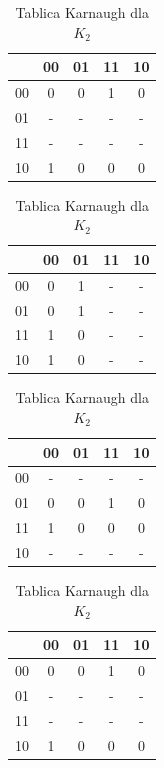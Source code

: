 \documentclass[12pt,a4paper]{article}
\begin{document}
			\begin{table}[H]
				\begin{minipage}{.5\textwidth}
					\caption{Tablica Karnaugh dla $J_2$}
					\vspace{0.2cm}
					\centering
					\begin{tabular}{c|c|c|c|c}
						\backslashbox{$AQ_2$}{$Q_1Q_0$}&00&01&11&10\\\hline
						00	&	0	&	0	&	1	&	0	\\\hline
						01	&	-	&	-	&	-	&	-	\\\hline
						11	&	-	&	-	&	-	&	-	\\\hline
						10	&	1	&	0	&	0	&	0	
					\end{tabular}
				
					\caption{Tablica Karnaugh dla $J_1$}
					\vspace{0.2cm}
					\centering
					\begin{tabular}{c|c|c|c|c}
						\backslashbox{$AQ_2$}{$Q_1Q_0$}&00&01&11&10\\\hline
						00	&	0	&	1	&	-	&	-	\\\hline
						01	&	0	&	1	&	-	&	-	\\\hline
						11	&	1	&	0	&	-	&	-	\\\hline
						10	&	1	&	0	&	-	&	-	
					\end{tabular}
				
					\caption{Tablica Karnaugh dla $J_0$}
					\vspace{0.2cm}
					\centering
					\begin{tabular}{c|c|c|c|c}
						\backslashbox{$AQ_2$}{$Q_1Q_0$}&00&01&11&10\\\hline
						00	&	-	&	-	&	-	&	-	\\\hline
						01	&	0	&	0	&	1	&	0	\\\hline
						11	&	1	&	0	&	0	&	0	\\\hline
						10	&	-	&	-	&	-	&	-	
					\end{tabular}
				\end{minipage}%
				\begin{minipage}{.5\textwidth}
					\caption{Tablica Karnaugh dla $K_2$}
					\vspace{0.2cm}
					\centering
					\begin{tabular}{c|c|c|c|c}
						\backslashbox{$AQ_2$}{$Q_1Q_0$}&00&01&11&10\\\hline
						00	&	0	&	0	&	1	&	0	\\\hline
						01	&	-	&	-	&	-	&	-	\\\hline
						11	&	-	&	-	&	-	&	-	\\\hline
						10	&	1	&	0	&	0	&	0	
					\end{tabular}
					

\end{minipage}
\end{table}
\end{document}
